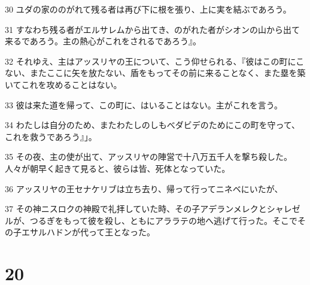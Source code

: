 \par 30 ユダの家ののがれて残る者は再び下に根を張り、上に実を結ぶであろう。
\par 31 すなわち残る者がエルサレムから出てき、のがれた者がシオンの山から出て来るであろう。主の熱心がこれをされるであろう』。
\par 32 それゆえ、主はアッスリヤの王について、こう仰せられる、『彼はこの町にこない、またここに矢を放たない、盾をもってその前に来ることなく、また塁を築いてこれを攻めることはない。
\par 33 彼は来た道を帰って、この町に、はいることはない。主がこれを言う。
\par 34 わたしは自分のため、またわたしのしもべダビデのためにこの町を守って、これを救うであろう』」。
\par 35 その夜、主の使が出て、アッスリヤの陣営で十八万五千人を撃ち殺した。人々が朝早く起きて見ると、彼らは皆、死体となっていた。
\par 36 アッスリヤの王セナケリブは立ち去り、帰って行ってニネベにいたが、
\par 37 その神ニスロクの神殿で礼拝していた時、その子アデランメレクとシャレゼルが、つるぎをもって彼を殺し、ともにアララテの地へ逃げて行った。そこでその子エサルハドンが代って王となった。

\chapter{20}

